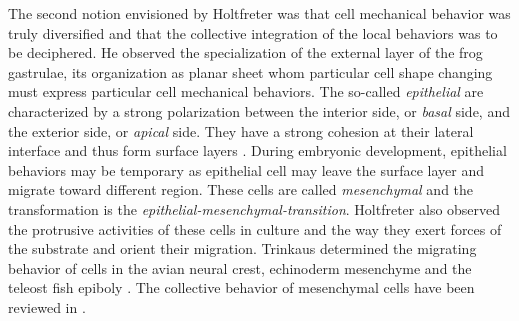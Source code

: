   The second notion envisioned by Holtfreter was that cell mechanical behavior was truly diversified and that the collective integration of the local behaviors was to be deciphered. He observed the specialization of the external layer of the frog gastrulae, its organization as planar sheet whom particular cell shape changing must express particular cell mechanical behaviors. The so-called \textit{epithelial} are characterized by a strong polarization between the interior side, or \textit{basal} side, and the exterior side, or \textit{apical} side. They have a strong cohesion at their lateral interface and thus form surface layers \cite{Apodaca:2012hn}. During embryonic development, epithelial behaviors may be temporary as epithelial cell may leave the surface layer and migrate toward different region. These cells are called \textit{mesenchymal} and the transformation is the \textit{epithelial-mesenchymal-transition}. Holtfreter also observed the protrusive activities of these cells in culture and the way they exert forces of the substrate and orient their migration. Trinkaus determined the migrating behavior of cells in the avian neural crest, echinoderm mesenchyme and the teleost fish epiboly \cite{Trinkaus:1984uh}. The collective behavior of mesenchymal cells have been reviewed in \cite{Weijer:2009hy}\cite{Ilina:2009dx}\cite{Rorth:2009gl}\cite{Vedula:2012ja}. 


